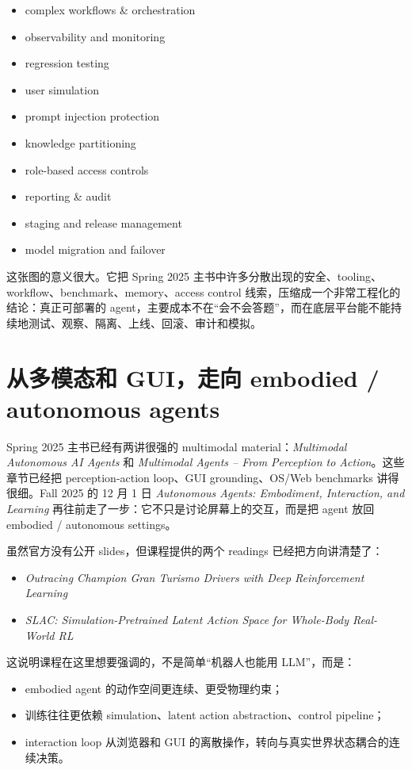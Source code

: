 \begin{itemize}
\item complex workflows \& orchestration
\item observability and monitoring
\item regression testing
\item user simulation
\item prompt injection protection
\item knowledge partitioning
\item role-based access controls
\item reporting \& audit
\item staging and release management
\item model migration and failover
\end{itemize}

这张图的意义很大。它把 Spring 2025 主书中许多分散出现的安全、tooling、workflow、benchmark、memory、access control 线索，压缩成一个非常工程化的结论：真正可部署的 agent，主要成本不在“会不会答题”，而在底层平台能不能持续地测试、观察、隔离、上线、回滚、审计和模拟。

\section{从多模态和 GUI，走向 embodied / autonomous agents}

Spring 2025 主书已经有两讲很强的 multimodal material：\emph{Multimodal Autonomous AI Agents} 和 \emph{Multimodal Agents -- From Perception to Action}。这些章节已经把 perception-action loop、GUI grounding、OS/Web benchmarks 讲得很细。Fall 2025 的 12 月 1 日 \emph{Autonomous Agents: Embodiment, Interaction, and Learning} 再往前走了一步：它不只是讨论屏幕上的交互，而是把 agent 放回 embodied / autonomous settings。

虽然官方没有公开 slides，但课程提供的两个 readings 已经把方向讲清楚了：

\begin{itemize}
\item \emph{Outracing Champion Gran Turismo Drivers with Deep Reinforcement Learning}
\item \emph{SLAC: Simulation-Pretrained Latent Action Space for Whole-Body Real-World RL}
\end{itemize}

这说明课程在这里想要强调的，不是简单“机器人也能用 LLM”，而是：

\begin{itemize}
\item embodied agent 的动作空间更连续、更受物理约束；
\item 训练往往更依赖 simulation、latent action abstraction、control pipeline；
\item interaction loop 从浏览器和 GUI 的离散操作，转向与真实世界状态耦合的连续决策。
\end{itemize}

